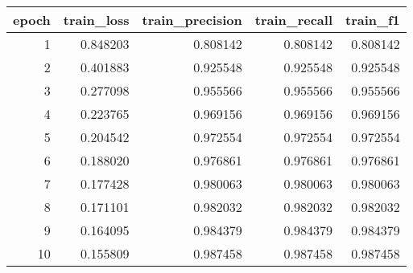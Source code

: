 \begin{tabular}{rrrrr}
\toprule
epoch & train_loss & train_precision & train_recall & train_f1 \\
\midrule
1 & 0.848203 & 0.808142 & 0.808142 & 0.808142 \\
2 & 0.401883 & 0.925548 & 0.925548 & 0.925548 \\
3 & 0.277098 & 0.955566 & 0.955566 & 0.955566 \\
4 & 0.223765 & 0.969156 & 0.969156 & 0.969156 \\
5 & 0.204542 & 0.972554 & 0.972554 & 0.972554 \\
6 & 0.188020 & 0.976861 & 0.976861 & 0.976861 \\
7 & 0.177428 & 0.980063 & 0.980063 & 0.980063 \\
8 & 0.171101 & 0.982032 & 0.982032 & 0.982032 \\
9 & 0.164095 & 0.984379 & 0.984379 & 0.984379 \\
10 & 0.155809 & 0.987458 & 0.987458 & 0.987458 \\
\bottomrule
\end{tabular}
